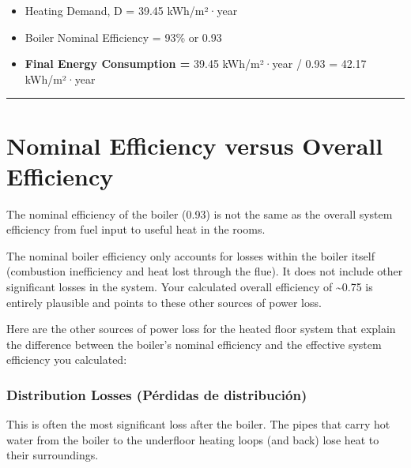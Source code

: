 \documentclass[
  10pt,
  letterpaper,
]{scrbook}
\providecommand{\tightlist}{%
  \setlength{\itemsep}{0pt}\setlength{\parskip}{0pt}}
\begin{document}
\begin{itemize}
\tightlist
\item
  Heating Demand, D = 39.45 kWh/m²·year
\item
  Boiler Nominal Efficiency = 93\% or 0.93
\item
  \textbf{Final Energy Consumption =} 39.45 kWh/m²·year / 0.93 = 42.17
  kWh/m²·year
\end{itemize}

\begin{center}\rule{0.5\linewidth}{0.5pt}\end{center}

\section{Nominal Efficiency versus Overall
Efficiency}\label{nominal-efficiency-versus-overall-efficiency}

The nominal efficiency of the boiler (0.93) is not the same as the
overall system efficiency from fuel input to useful heat in the rooms.

The nominal boiler efficiency only accounts for losses within the boiler
itself (combustion inefficiency and heat lost through the flue). It does
not include other significant losses in the system. Your calculated
overall efficiency of \textasciitilde0.75 is entirely plausible and
points to these other sources of power loss.

Here are the other sources of power loss for the heated floor system
that explain the difference between the boiler's nominal efficiency and
the effective system efficiency you calculated:

\subsubsection{Distribution Losses (Pérdidas de
distribución)}\label{distribution-losses-puxe9rdidas-de-distribuciuxf3n}

This is often the most significant loss after the boiler. The pipes that
carry hot water from the boiler to the underfloor heating loops (and
back) lose heat to their surroundings.
\end{document}
